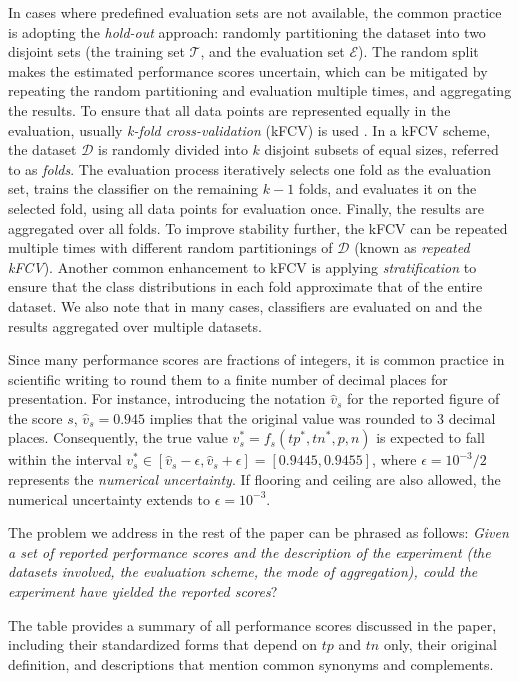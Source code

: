 \documentclass[3p, times]{elsarticle}
\begin{document}
In cases where predefined evaluation sets are not available, the common practice is adopting the \emph{hold-out} approach: randomly partitioning the dataset into two disjoint sets (the training set  $\mathcal{T}$, and the evaluation set $\mathcal{E}$).
The random split makes the estimated performance scores uncertain, which can be mitigated by repeating the random partitioning and evaluation multiple times, and aggregating the results. To ensure that all data points are represented equally in the evaluation, usually \emph{k-fold cross-validation} (kFCV) is used \cite{cv1}.
In a kFCV scheme, the dataset $\mathcal{D}$ is randomly divided into $k$ disjoint subsets of equal sizes, referred to as \emph{folds}. The evaluation process iteratively selects one fold as the evaluation set, trains the classifier on the remaining $k-1$ folds, and evaluates it on the selected fold, using all data points for evaluation once. Finally, the results are aggregated over all folds. 
To improve stability further, the kFCV can be repeated multiple times with different random partitionings of $\mathcal{D}$ (known as \emph{repeated kFCV}). Another common enhancement to kFCV is applying \emph{stratification} to ensure that the class distributions in each fold approximate that of the entire dataset. We also note that in many cases, classifiers are evaluated on and the results aggregated over multiple datasets.

Since many performance scores are fractions of integers, it is common practice in scientific writing to round them to a finite number of decimal places for presentation. For instance, introducing the notation $\hat{v}_s$ for the reported figure of the score $s$, $\hat{v}_s = 0.945$ implies that the original value was rounded to $3$ decimal places. Consequently, the true value $v_s^{*} = f_s(tp^{*}, tn^{*}, p, n)$ is expected to fall within the interval $v_s^{*} \in [\hat{v}_s - \epsilon, \hat{v}_s + \epsilon] = [0.9445, 0.9455]$, where $\epsilon = 10^{-3}/2$ represents the \emph{numerical uncertainty}. If flooring and ceiling are also allowed, the numerical uncertainty extends to $\epsilon = 10^{-3}$.

The problem we address in the rest of the paper can be phrased as follows: \emph{Given a set of reported performance scores and the description of the experiment (the datasets involved, the evaluation scheme, the mode of aggregation), could the experiment have yielded the reported scores}?

\begin{table}
\caption{The table provides a summary of all performance scores discussed in the paper, including their standardized forms that depend on $tp$ and $tn$ only, their original definition, and descriptions that mention common synonyms and complements.}
\label{tab:scores}
\begin{scriptsize}
\begingroup
\renewcommand{\arraystretch}{3.0}

\endgroup
\end{scriptsize}
\end{table}
\end{document}
